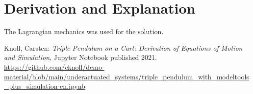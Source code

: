 \documentclass[10pt,a4paper]{article}
\begin{document}
	
	\section{Derivation and Explanation} %
	
	The Lagrangian mechanics was used for the solution.
	
	
	\begin{thebibliography}{10}		
		Knoll, Carsten: 
		\textit{Triple Pendulum on a Cart: Derivation of Equations of Motion and Simulation}, Jupyter Notebook published 2021. \\
		\url{https://github.com/cknoll/demo-material/blob/main/underactuated_systems/triple_pendulum_with_modeltools_plus_simulation-en.ipynb}
	\end{thebibliography}
\end{document}

